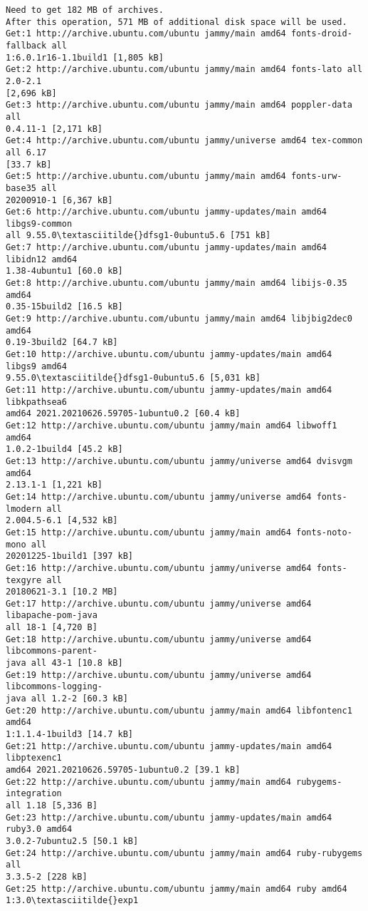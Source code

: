 \documentclass[11pt]{article}
\begin{document}
\begin{Verbatim}[commandchars=\\\{\}]
Need to get 182 MB of archives.
After this operation, 571 MB of additional disk space will be used.
Get:1 http://archive.ubuntu.com/ubuntu jammy/main amd64 fonts-droid-fallback all
1:6.0.1r16-1.1build1 [1,805 kB]
Get:2 http://archive.ubuntu.com/ubuntu jammy/main amd64 fonts-lato all 2.0-2.1
[2,696 kB]
Get:3 http://archive.ubuntu.com/ubuntu jammy/main amd64 poppler-data all
0.4.11-1 [2,171 kB]
Get:4 http://archive.ubuntu.com/ubuntu jammy/universe amd64 tex-common all 6.17
[33.7 kB]
Get:5 http://archive.ubuntu.com/ubuntu jammy/main amd64 fonts-urw-base35 all
20200910-1 [6,367 kB]
Get:6 http://archive.ubuntu.com/ubuntu jammy-updates/main amd64 libgs9-common
all 9.55.0\textasciitilde{}dfsg1-0ubuntu5.6 [751 kB]
Get:7 http://archive.ubuntu.com/ubuntu jammy-updates/main amd64 libidn12 amd64
1.38-4ubuntu1 [60.0 kB]
Get:8 http://archive.ubuntu.com/ubuntu jammy/main amd64 libijs-0.35 amd64
0.35-15build2 [16.5 kB]
Get:9 http://archive.ubuntu.com/ubuntu jammy/main amd64 libjbig2dec0 amd64
0.19-3build2 [64.7 kB]
Get:10 http://archive.ubuntu.com/ubuntu jammy-updates/main amd64 libgs9 amd64
9.55.0\textasciitilde{}dfsg1-0ubuntu5.6 [5,031 kB]
Get:11 http://archive.ubuntu.com/ubuntu jammy-updates/main amd64 libkpathsea6
amd64 2021.20210626.59705-1ubuntu0.2 [60.4 kB]
Get:12 http://archive.ubuntu.com/ubuntu jammy/main amd64 libwoff1 amd64
1.0.2-1build4 [45.2 kB]
Get:13 http://archive.ubuntu.com/ubuntu jammy/universe amd64 dvisvgm amd64
2.13.1-1 [1,221 kB]
Get:14 http://archive.ubuntu.com/ubuntu jammy/universe amd64 fonts-lmodern all
2.004.5-6.1 [4,532 kB]
Get:15 http://archive.ubuntu.com/ubuntu jammy/main amd64 fonts-noto-mono all
20201225-1build1 [397 kB]
Get:16 http://archive.ubuntu.com/ubuntu jammy/universe amd64 fonts-texgyre all
20180621-3.1 [10.2 MB]
Get:17 http://archive.ubuntu.com/ubuntu jammy/universe amd64 libapache-pom-java
all 18-1 [4,720 B]
Get:18 http://archive.ubuntu.com/ubuntu jammy/universe amd64 libcommons-parent-
java all 43-1 [10.8 kB]
Get:19 http://archive.ubuntu.com/ubuntu jammy/universe amd64 libcommons-logging-
java all 1.2-2 [60.3 kB]
Get:20 http://archive.ubuntu.com/ubuntu jammy/main amd64 libfontenc1 amd64
1:1.1.4-1build3 [14.7 kB]
Get:21 http://archive.ubuntu.com/ubuntu jammy-updates/main amd64 libptexenc1
amd64 2021.20210626.59705-1ubuntu0.2 [39.1 kB]
Get:22 http://archive.ubuntu.com/ubuntu jammy/main amd64 rubygems-integration
all 1.18 [5,336 B]
Get:23 http://archive.ubuntu.com/ubuntu jammy-updates/main amd64 ruby3.0 amd64
3.0.2-7ubuntu2.5 [50.1 kB]
Get:24 http://archive.ubuntu.com/ubuntu jammy/main amd64 ruby-rubygems all
3.3.5-2 [228 kB]
Get:25 http://archive.ubuntu.com/ubuntu jammy/main amd64 ruby amd64 1:3.0\textasciitilde{}exp1

\end{Verbatim}
\end{document}
